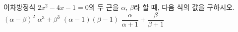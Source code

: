 이차방정식 $2x^2-4x-1=0$의 두 근을 $\alpha$, $\beta$라 할 때, 다음 식의 값을 구하시오.
 $(\alpha-\beta)^2$
 $\alpha^3+\beta^3$
 $(\alpha-1)(\beta-1)$
 $\dfrac{\alpha}{\alpha+1}+\dfrac{\beta}{\beta+1}$
